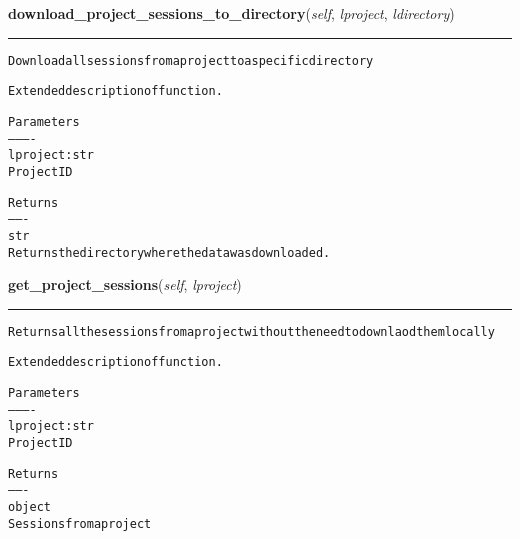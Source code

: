     \label{source:Xnat:Xnat:download_project_sessions_to_directory}

    \vspace{0.5ex}

\hspace{.8\funcindent}\begin{boxedminipage}{\funcwidth}

    \raggedright \textbf{download\_project\_sessions\_to\_directory}(\textit{self}, \textit{lproject}, \textit{ldirectory})

    \vspace{-1.5ex}

    \rule{\textwidth}{0.5\fboxrule}
\setlength{\parskip}{2ex}
\begin{alltt}

Download all sessions from a project to a specific directory

Extended description of function.

Parameters
----------
lproject : str
    Project ID

Returns
-------
str
    Returns the directory where the data was downloaded.
\end{alltt}

\setlength{\parskip}{1ex}
    \end{boxedminipage}

    \label{source:Xnat:Xnat:get_project_sessions}

    \vspace{0.5ex}

\hspace{.8\funcindent}\begin{boxedminipage}{\funcwidth}

    \raggedright \textbf{get\_project\_sessions}(\textit{self}, \textit{lproject})

    \vspace{-1.5ex}

    \rule{\textwidth}{0.5\fboxrule}
\setlength{\parskip}{2ex}
\begin{alltt}

Returns all the sessions from a project without the need to downlaod them locally

Extended description of function.

Parameters
----------
lproject : str
    Project ID

Returns
-------
object
    Sessions from a project
\end{alltt}

\setlength{\parskip}{1ex}
    \end{boxedminipage}

